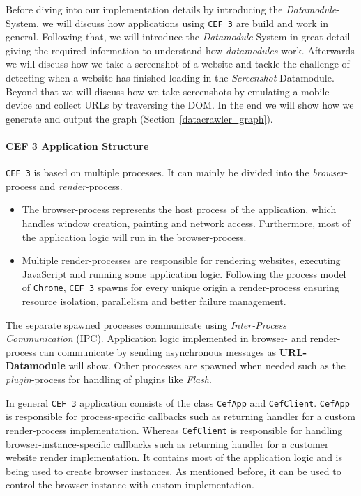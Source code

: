 Before diving into our implementation details by introducing the \textit{Datamodule}-System, we will discuss how applications using \texttt{CEF 3} are build and work in general. Following that, we will introduce the \textit{Datamodule}-System in great detail giving the required information to understand how \textit{datamodules} work. Afterwards we will discuss how we take a screenshot of a website and tackle the challenge of detecting when a website has finished loading in the \textit{Screenshot}-Datamodule. Beyond that we will discuss how we take screenshots by emulating a mobile device and collect URLs by traversing the DOM. In the end we will show how we generate and output the graph (Section~\ref{datacrawler_graph}).

\paragraph*{CEF 3 Application Structure}
\label{datacrawler_cef_architecture}
\texttt{CEF 3} is based on multiple processes. It can mainly be divided into the \textit{browser}-process and \textit{render}-process.

\begin{itemize}
	\item The browser-process represents the host process of the application, which handles window creation, painting and network access. Furthermore, most of the application logic will run in the browser-process. 
	\item Multiple render-processes are responsible for rendering websites, executing JavaScript and running some application logic. Following the process model of \texttt{Chrome}, \texttt{CEF 3} spawns for every unique origin a render-process ensuring resource isolation, parallelism and better failure management.
\end{itemize}

The separate spawned processes communicate using \textit{Inter-Process Communication} (IPC). Application logic implemented in browser- and render-process can communicate by sending asynchronous messages as \textbf{URL-Datamodule} will show. Other processes are spawned when needed such as the \textit{plugin}-process for handling of plugins like \textit{Flash}.

In general \texttt{CEF 3} application consists of the class \texttt{CefApp} and \texttt{CefClient}. \texttt{CefApp} is responsible for process-specific callbacks such as returning handler for a custom render-process implementation. Whereas \texttt{CefClient} is responsible for handling browser-instance-specific callbacks such as returning handler for a customer website render implementation. It contains most of the application logic and is being used to create browser instances. As mentioned before, it can be used to control the browser-instance with custom implementation.

